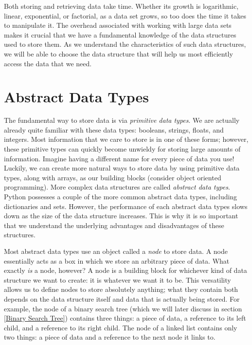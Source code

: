 \label{lab:Python_DataStructures}

Both storing and retrieving data take time.
Whether its growth is logarithmic, linear, exponential, or factorial, as a data set grows, so too does the time it takes to manipulate it.
The overhead associated with working with large data sets makes it crucial that we have a fundamental knowledge of the data structures used to store them.
As we understand the characteristics of such data structures, we will be able to choose the data structure that will help us most efficiently access the data that we need.

\section*{Abstract Data Types}
The fundamental way to store data is via \emph{primitive data types}.
We are actually already quite familiar with these data types: booleans, strings, floats, and integers.
Most information that we care to store is in one of these forms; however, these primitive types can quickly become unwieldy for storing large amounts of information.
Imagine having a different name for every piece of data you use!
Luckily, we can create more natural ways to store data by using primitive data types, along with arrays, as our building blocks (consider object oriented programming).
More complex data structures are called \emph{abstract data types}.
Python possesses a couple of the more common abstract data types, including dictionaries and sets.
However, the performance of each abstract data types slows down as the size of the data structure increases.
 This is why it is so important that we understand the underlying advantages and disadvantages of these structures.

Most abstract data types use an object called a \emph{node} to store data.
A node essentially acts as a box in which we store an arbitrary piece of data.
What exactly \emph{is} a node, however?
A node is a building block for whichever kind of data structure we want to create: it is whatever we want it to be.
This versatility allows us to define nodes to store absolutely anything; what they contain both depends on the data structure itself and data that is actually being stored.
For example, the node of a binary search tree (which we will later discuss in section \ref{Binary Search Tree}) contains three things: a piece of data, a reference to its left child, and a reference to its right child.
The node of a linked list contains only two things: a piece of data and a reference to the next node it links to.

